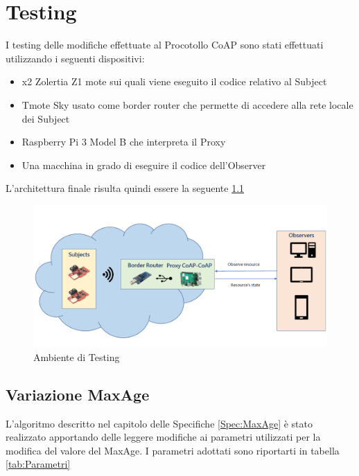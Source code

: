 

\chapter{Testing}
  I testing delle modifiche effettuate al Procotollo CoAP sono stati effettuati utilizzando i seguenti dispositivi:
  \begin{itemize}
    \item x2 Zolertia Z1 mote sui quali viene eseguito il codice relativo al Subject
    \item Tmote Sky usato come border router che permette di accedere alla rete locale dei Subject
    \item Raspberry Pi 3 Model B che interpreta il Proxy
    \item Una macchina in grado di eseguire il codice dell'Observer
  \end{itemize}
  L'architettura finale risulta quindi essere la seguente \ref{fig:architettura}
  \begin{figure}
    \includegraphics[width=\linewidth]{../Immagini/ArchitetturaGenerale.png}
    \caption{Ambiente di Testing}
    \label{fig:architettura}
  \end{figure}
  \section{Variazione MaxAge}
      L'algoritmo descritto nel capitolo delle Specifiche \ref{Spec:MaxAge} è stato realizzato apportando delle leggere modifiche ai parametri utilizzati per la modifica del valore del MaxAge. I parametri adottati sono riportarti in tabella \ref{tab:Parametri}

